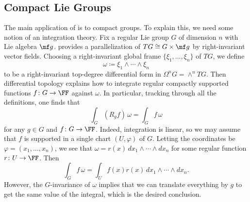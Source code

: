 \documentclass[../notes.tex]{subfiles}
\begin{document}
\subsection{Compact Lie Groups}
The main application of  is to compact groups. To explain this, we need some notion of an integration theory. Fix a regular Lie group $G$ of dimension $n$ with Lie algebra $\mf g$.  provides a parallelization of $TG\cong G\times\mf g$ by right-invariant vector fields. Choosing a right-invariant global frame $\{\xi_1,\ldots,\xi_n\}$ of $TG$, we define
\[\omega\coloneqq\xi_1\land\cdots\land\xi_n\]
to be a right-invariant top-degree differential form in $\Omega^nG=\land^nTG$. Then differential topology explains how to integrate regular compactly supported functions $f\colon G\to\FF$ against $\omega$. In particular, tracking through all the definitions, one finds that
\[\int_G(R_gf)\,\omega=\int_Gf\,\omega\]
for any $g\in G$ and $f\colon G\to\FF$. Indeed, integration is linear, so we may assume that $f$ is supported in a single chart $(U,\varphi)$ of $G$. Letting the coordinates be $\varphi=(x_1,\ldots,x_n)$, we see that $\omega=r(x)\,dx_1\land\cdots\land dx_n$ for some regular function $r\colon U\to\FF$. Then
\[\int_Gf\,\omega=\int_Uf(x)r(x)\,dx_1\land\cdots\land dx_n.\]
However, the $G$-invariance of $\omega$ implies that we can translate everything by $g$ to get the same value of the integral, which is the desired conclusion.
\end{document}
